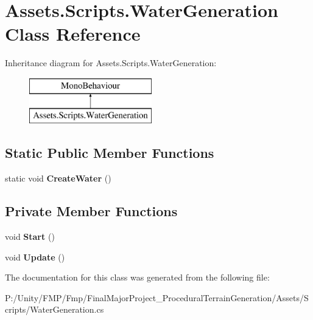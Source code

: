 \hypertarget{class_assets_1_1_scripts_1_1_water_generation}{}\section{Assets.\+Scripts.\+Water\+Generation Class Reference}
\label{class_assets_1_1_scripts_1_1_water_generation}
Inheritance diagram for Assets.\+Scripts.\+Water\+Generation\+:\begin{figure}[H]
\begin{center}
\leavevmode
\includegraphics[height=2.000000cm]{class_assets_1_1_scripts_1_1_water_generation}
\end{center}
\end{figure}
\subsection*{Static Public Member Functions}
\begin{DoxyCompactItemize}
\item 
\mbox{\label{class_assets_1_1_scripts_1_1_water_generation_afe8b2c52f34cd3b7c8165647ef81a67c}} 
static void {\bfseries Create\+Water} ()
\end{DoxyCompactItemize}
\subsection*{Private Member Functions}
\begin{DoxyCompactItemize}
\item 
\mbox{\label{class_assets_1_1_scripts_1_1_water_generation_a470eab30f9f3db9e24ac9f80c092064f}} 
void {\bfseries Start} ()
\item 
\mbox{\label{class_assets_1_1_scripts_1_1_water_generation_afedff6b46eb257d22687b27763a4d3bd}} 
void {\bfseries Update} ()
\end{DoxyCompactItemize}


The documentation for this class was generated from the following file\+:\begin{DoxyCompactItemize}
\item 
P\+:/\+Unity/\+F\+M\+P/\+Fmp/\+Final\+Major\+Project\+\_\+\+Procedural\+Terrain\+Generation/\+Assets/\+Scripts/Water\+Generation.\+cs\end{DoxyCompactItemize}
